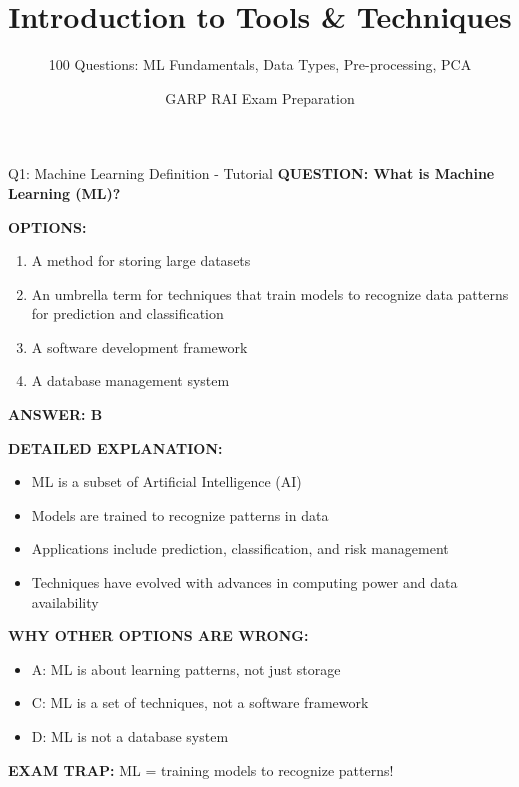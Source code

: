 \documentclass[8pt]{beamer}
\title{Introduction to Tools \& Techniques}
\subtitle{100 Questions: ML Fundamentals, Data Types, Pre-processing, PCA}
\author{GARP RAI Exam Preparation}
\date{}
\begin{document}
	
	\begin{frame}
		\titlepage
	\end{frame}
	
	
	\begin{frame}{Q1: Machine Learning Definition - Tutorial}
		\fontsize{6.5}{7.5}\selectfont
		\textbf{QUESTION: What is Machine Learning (ML)?}
		
		\vspace{0.1cm}
		\textbf{OPTIONS:}
		\begin{enumerate}
			\item A method for storing large datasets
			\item An umbrella term for techniques that train models to recognize data patterns for prediction and classification
			\item A software development framework
			\item A database management system
		\end{enumerate}
		
		\vspace{0.1cm}
		\textcolor{myblue}{\textbf{ANSWER: B}}
		
		\vspace{0.1cm}
		\textbf{DETAILED EXPLANATION:}
		\begin{itemize}
			\item ML is a subset of Artificial Intelligence (AI)
			\item Models are trained to recognize patterns in data
			\item Applications include prediction, classification, and risk management
			\item Techniques have evolved with advances in computing power and data availability
		\end{itemize}
		
		\vspace{0.1cm}
		\textcolor{myred}{\textbf{WHY OTHER OPTIONS ARE WRONG:}}
		\begin{itemize}
			\item \textcolor{myred}{A:} ML is about learning patterns, not just storage
			\item \textcolor{myred}{C:} ML is a set of techniques, not a software framework
			\item \textcolor{myred}{D:} ML is not a database system
		\end{itemize}
		
		\textcolor{myred}{\textbf{EXAM TRAP:}} ML = \textcolor{myblue}{training models to recognize patterns}!
	\end{frame}
	
\end{document}
